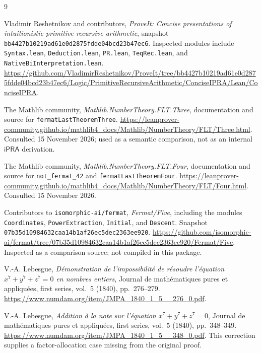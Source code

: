 \documentclass[11pt,letterpaper]{article}
\newcommand{\ipra}{\mathsf{iPRA}}
\theoremstyle{remark}
\numberwithin{equation}{section}
\begin{document}
\clearpage
\begin{thebibliography}{9}

Vladimir Reshetnikov and contributors,
\emph{ProveIt: Concise presentations of intuitionistic primitive recursive
arithmetic}, snapshot
\texttt{bb4427b10219ad61e0d2875fdde04bcd23b47ec6}.
Inspected modules include \texttt{Syntax.lean}, \texttt{Deduction.lean},
\texttt{PR.lean}, \texttt{TeqRec.lean}, and
\texttt{NativeBiInterpretation.lean}.
\url{https://github.com/VladimirReshetnikov/ProveIt/tree/bb4427b10219ad61e0d2875fdde04bcd23b47ec6/Logic/PrimitiveRecursiveArithmetic/ConciseIPRA/Lean/ConciseIPRA}.

The Mathlib community,
\emph{Mathlib.NumberTheory.FLT.Three}, documentation and source for
\texttt{fermatLastTheoremThree}.
\url{https://leanprover-community.github.io/mathlib4_docs/Mathlib/NumberTheory/FLT/Three.html}.
Consulted 15 November 2026; used as a semantic comparison, not as an
internal $\ipra$ derivation.

The Mathlib community,
\emph{Mathlib.NumberTheory.FLT.Four}, documentation and source for
\texttt{not\_fermat\_42} and \texttt{fermatLastTheoremFour}.
\url{https://leanprover-community.github.io/mathlib4_docs/Mathlib/NumberTheory/FLT/Four.html}.
Consulted 15 November 2026.

Contributors to \texttt{isomorphic-ai/fermat},
\emph{Fermat/Five}, including the modules \texttt{Coordinates},
\texttt{PowerExtraction}, \texttt{Initial}, and \texttt{Descent}.
Snapshot \texttt{07b35d10984632caa14b1af26ec5dec2363ee920}.
\url{https://github.com/isomorphic-ai/fermat/tree/07b35d10984632caa14b1af26ec5dec2363ee920/Fermat/Five}.
Inspected as a comparison source; not compiled in this package.

V.-A. Lebesgue,
\emph{D\'emonstration de l'impossibilit\'e de r\'esoudre l'\'equation
$x^7+y^7+z^7=0$ en nombres entiers},
Journal de math\'ematiques pures et appliqu\'ees, first series,
vol.~5 (1840), pp.~276--279.
\url{https://www.numdam.org/item/JMPA_1840_1_5__276_0.pdf}.

V.-A. Lebesgue,
\emph{Addition \`a la note sur l'\'equation $x^7+y^7+z^7=0$},
Journal de math\'ematiques pures et appliqu\'ees, first series,
vol.~5 (1840), pp.~348--349.
\url{https://www.numdam.org/item/JMPA_1840_1_5__348_0.pdf}.
This correction supplies a factor-allocation case missing from the
original proof.

\end{thebibliography}
\end{document}
